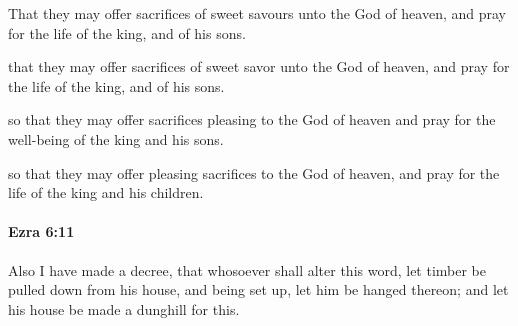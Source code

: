 			That they may offer sacrifices of sweet savours unto the God of heaven, and pray for the life of the king, and of his sons.

			\begin{versebox}
					\item[BHS] 
					\item[LXX] 
					\item[ASV] that they may offer sacrifices of sweet savor unto the God of heaven, and pray for the life of the king, and of his sons.
					\item[NIV] so that they may offer sacrifices pleasing to the God of heaven and pray for the well-being of the king and his sons.
					\item[NRSV] so that they may offer pleasing sacrifices to the God of heaven, and pray for the life of the king and his children.
			\end{versebox}

		\paragraph{Ezra 6:11} %
			\label{EZRA-6-11}

			Also I have made a decree, that whosoever shall alter this word, let timber be pulled down from his house, and being set up, let him be hanged thereon; and let his house be made a dunghill for this.

